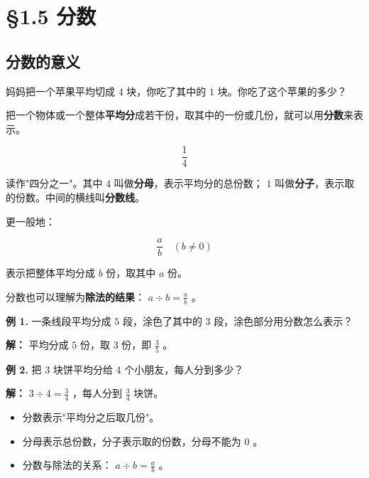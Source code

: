 \chapter{§1.5 分数}
\label{sec:1.5}





\section*{分数的意义}


\begin{explore}


妈妈把一个苹果平均切成 $4$ 块，你吃了其中的 $1$ 块。你吃了这个苹果的多少？

\end{explore}

\begin{understand}


把一个物体或一个整体\textbf{平均分}成若干份，取其中的一份或几份，就可以用\textbf{分数}来表示。

\[
\frac{1}{4}
\]


读作"四分之一"。其中 $4$ 叫做\textbf{分母}，表示平均分的总份数； $1$ 叫做\textbf{分子}，表示取的份数。中间的横线叫\textbf{分数线}。

更一般地：

\[
\frac{a}{b} \quad (b \neq 0)
\]


表示把整体平均分成 $b$ 份，取其中 $a$ 份。

分数也可以理解为\textbf{除法的结果}： $a \div b = \frac{a}{b}$ 。

\end{understand}

\begin{workedexamples}


\textbf{例 1.} 一条线段平均分成 $5$ 段，涂色了其中的 $3$ 段，涂色部分用分数怎么表示？

\textbf{解：} 平均分成 $5$ 份，取 $3$ 份，即 $\frac{3}{5}$ 。

\textbf{例 2.} 把 $3$ 块饼平均分给 $4$ 个小朋友，每人分到多少？

\textbf{解：} $3 \div 4 = \frac{3}{4}$ ，每人分到 $\frac{3}{4}$ 块饼。

\end{workedexamples}

\begin{keytakeaway}


\begin{itemize}
  \item 分数表示"平均分之后取几份"。
  \item 分母表示总份数，分子表示取的份数，分母不能为 $0$ 。
  \item 分数与除法的关系： $a \div b = \frac{a}{b}$ 。
\end{itemize}


\end{keytakeaway}

